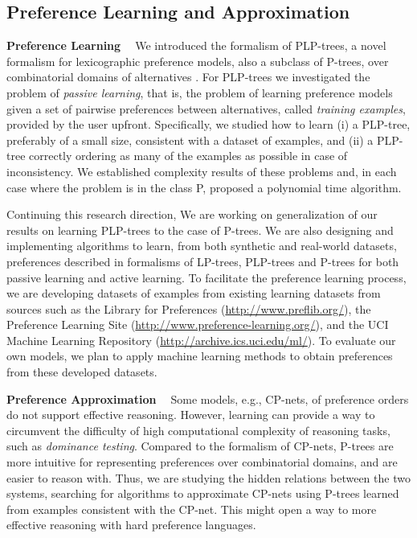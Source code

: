 \documentclass[11pt]{article}
\begin{document}
\subsection{Preference Learning and Approximation}
\smallskip \noindent \textbf{Preference Learning \ }
We introduced the formalism of PLP-trees, a novel formalism for lexicographic preference models,
also a subclass of P-trees, over combinatorial domains of alternatives \cite{LiuT:Learn_PLPTrees}.
For PLP-trees we investigated the problem of \textit{passive learning},
that is, the problem of learning preference models given a set of
pairwise preferences between alternatives, called \textit{training examples}, provided by the user upfront.
Specifically, we studied how to learn (i) a PLP-tree, preferably of a small size, 
consistent with a dataset of examples, and (ii) a PLP-tree correctly
ordering as many of the examples as possible in case
of inconsistency. We established complexity results
of these problems and, in each case where the problem
is in the class P, proposed a polynomial time algorithm.

Continuing this research direction,
We are working on generalization of our results on learning PLP-trees to the case of P-trees.
We are also designing and implementing algorithms to learn, from both synthetic and real-world datasets, preferences
described in formalisms
of LP-trees, PLP-trees and P-trees for both passive learning and active learning.
To facilitate the preference learning process, we are developing datasets of examples from existing
learning datasets from sources such as the Library for Preferences (\url{http://www.preflib.org/}),
the Preference Learning Site (\url{http://www.preference-learning.org/}), 
and the UCI Machine Learning Repository (\url{http://archive.ics.uci.edu/ml/}).
To evaluate our own models, we plan to
apply machine learning methods to obtain preferences from these developed datasets.

\smallskip \noindent \textbf{Preference Approximation \ }
Some models, e.g., CP-nets, of preference orders do not support effective reasoning.
However, learning can provide a way to circumvent the difficulty of high computational complexity
of reasoning tasks, such as \textit{dominance testing}.
Compared to the formalism of CP-nets, P-trees are more intuitive
for representing preferences over combinatorial domains, and are easier to reason with.
Thus, we are studying the hidden relations between the two systems, searching for 
algorithms to approximate
CP-nets using P-trees learned from examples consistent with the CP-net.
This might open a way to more effective reasoning with hard preference languages.
\end{document}
